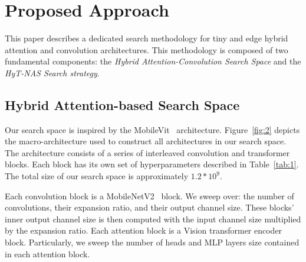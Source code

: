 \documentclass[conference]{IEEEtran}
\begin{document}
\section{Proposed Approach}
\label{sec:approach}
This paper describes a dedicated search methodology for tiny and edge hybrid attention and convolution architectures. This methodology is composed of two fundamental components: the \textit{Hybrid Attention-Convolution Search Space} and the \textit{HyT-NAS Search strategy}.



%
 \vspace{-0.25cm}
\subsection{Hybrid Attention-based Search Space}
\label{sec:search_space}
Our search space is inspired by the MobileVit~\cite{mobilevit} architecture. Figure~\ref{fig:2} depicts the macro-architecture used to construct all architectures in our search space. The architecture consists of a series of interleaved convolution and transformer blocks. Each block has its own set of hyperparameters described in Table~\ref{tab:1}. The total size of our search space is approximately $1.2 * 10^{9}$.

Each convolution block is a MobileNetV2~\cite{mobilenetv2} block. We sweep over: the number of convolutions, their expansion ratio, and their output channel size. These blocks' inner output channel size is then computed with the input channel size multiplied by the expansion ratio. Each attention block is a Vision transformer encoder block. Particularly, we sweep the number of heads and MLP layers size contained in each attention block. 
\end{document}
